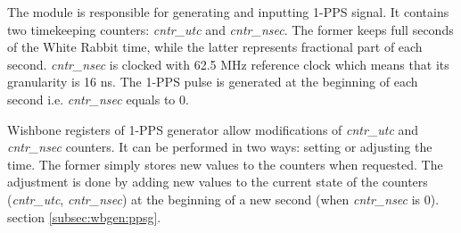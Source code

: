 The module is responsible for generating and inputting 1-PPS signal. It
contains two timekeeping counters: \emph{cntr\_utc} and \emph{cntr\_nsec}. The
former keeps full seconds of the White Rabbit time, while the latter represents
fractional part of each second. \emph{cntr\_nsec} is clocked with 62.5 MHz
reference clock which means that its granularity is 16 ns. The 1-PPS pulse is
generated at the beginning of each second i.e. \emph{cntr\_nsec} equals to 0.

Wishbone registers of 1-PPS generator allow modifications of \emph{cntr\_utc}
and \emph{cntr\_nsec} counters. It can be performed in two ways: setting or
adjusting the time. The former simply stores new values to the counters when
requested. The adjustment is done by adding new values to the current state of
the counters (\emph{cntr\_utc}, \emph{cntr\_nsec}) at the beginning of a new second (when \emph{cntr\_nsec} is 0).\\

 section \ref{subsec:wbgen:ppsg}.
